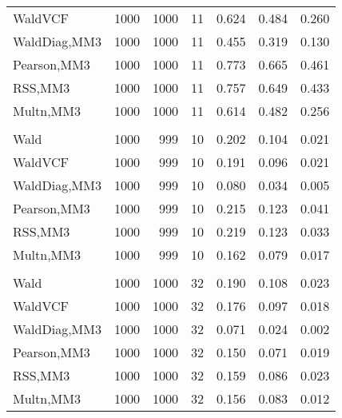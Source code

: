 \documentclass[
]{article}
\begin{document}
\begin{table}[H]
{\begin{tabular}[t]{lrrrrrr}
\hspace{1em}WaldVCF & 1000 & 1000 & 11 & 0.624 & 0.484 & 0.260\\
\hspace{1em}WaldDiag,MM3 & 1000 & 1000 & 11 & 0.455 & 0.319 & 0.130\\
\hspace{1em}Pearson,MM3 & 1000 & 1000 & 11 & 0.773 & 0.665 & 0.461\\
\hspace{1em}RSS,MM3 & 1000 & 1000 & 11 & 0.757 & 0.649 & 0.433\\
\hspace{1em}Multn,MM3 & 1000 & 1000 & 11 & 0.614 & 0.482 & 0.256\\
\addlinespace[0.3em]
\multicolumn{7}{l}{\textbf{2F 10V}}\\
\hspace{1em}Wald & 1000 & 999 & 10 & 0.202 & 0.104 & 0.021\\
\hspace{1em}WaldVCF & 1000 & 999 & 10 & 0.191 & 0.096 & 0.021\\
\hspace{1em}WaldDiag,MM3 & 1000 & 999 & 10 & 0.080 & 0.034 & 0.005\\
\hspace{1em}Pearson,MM3 & 1000 & 999 & 10 & 0.215 & 0.123 & 0.041\\
\hspace{1em}RSS,MM3 & 1000 & 999 & 10 & 0.219 & 0.123 & 0.033\\
\hspace{1em}Multn,MM3 & 1000 & 999 & 10 & 0.162 & 0.079 & 0.017\\
\addlinespace[0.3em]
\multicolumn{7}{l}{\textbf{3F 15V}}\\
\hspace{1em}Wald & 1000 & 1000 & 32 & 0.190 & 0.108 & 0.023\\
\hspace{1em}WaldVCF & 1000 & 1000 & 32 & 0.176 & 0.097 & 0.018\\
\hspace{1em}WaldDiag,MM3 & 1000 & 1000 & 32 & 0.071 & 0.024 & 0.002\\
\hspace{1em}Pearson,MM3 & 1000 & 1000 & 32 & 0.150 & 0.071 & 0.019\\
\hspace{1em}RSS,MM3 & 1000 & 1000 & 32 & 0.159 & 0.086 & 0.023\\
\hspace{1em}Multn,MM3 & 1000 & 1000 & 32 & 0.156 & 0.083 & 0.012\\
\bottomrule
\end{tabular}}
\endgroup{}
\end{table}
\end{document}
